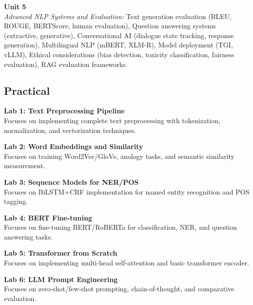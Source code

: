 \vspace{0.3cm}

\noindent\textbf{Unit 5} \\
\textit{Advanced NLP Systems and Evaluation:} Text generation evaluation (BLEU, ROUGE, BERTScore, human evaluation), Question answering systems (extractive, generative), Conversational AI (dialogue state tracking, response generation), Multilingual NLP (mBERT, XLM-R), Model deployment (TGI, vLLM), Ethical considerations (bias detection, toxicity classification, fairness evaluation), RAG evaluation frameworks.

\newpage

\subsection*{Practical}
\noindent\textbf{Lab 1: Text Preprocessing Pipeline} \\
Focuses on implementing complete text preprocessing with tokenization, normalization, and vectorization techniques.

\vspace{0.2cm}

\noindent\textbf{Lab 2: Word Embeddings and Similarity} \\
Focuses on training Word2Vec/GloVe, analogy tasks, and semantic similarity measurement.

\vspace{0.2cm}

\noindent\textbf{Lab 3: Sequence Models for NER/POS} \\
Focuses on BiLSTM+CRF implementation for named entity recognition and POS tagging.

\vspace{0.2cm}

\noindent\textbf{Lab 4: BERT Fine-tuning} \\
Focuses on fine-tuning BERT/RoBERTa for classification, NER, and question answering tasks.

\vspace{0.2cm}

\noindent\textbf{Lab 5: Transformer from Scratch} \\
Focuses on implementing multi-head self-attention and basic transformer encoder.

\vspace{0.2cm}

\noindent\textbf{Lab 6: LLM Prompt Engineering} \\
Focuses on zero-shot/few-shot prompting, chain-of-thought, and comparative evaluation.

